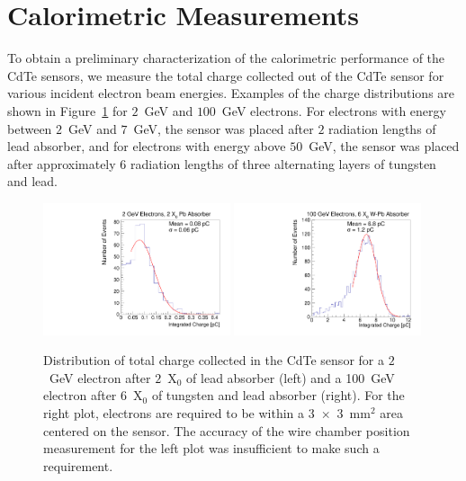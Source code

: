 
\section{Calorimetric Measurements} 
\label{sec:calorimetery} 

To obtain a preliminary characterization of the calorimetric performance 
of the CdTe sensors, we measure the total charge collected out of the CdTe 
sensor for various incident electron beam energies. Examples of the 
charge distributions are shown in Figure~\ref{fig:ChargeDistribution}
for $2$~GeV and $100$~GeV electrons. For electrons with energy between 
$2$~GeV and $7$~GeV, the sensor was placed after $2$ radiation lengths 
of lead absorber, and for electrons with energy above $50$~GeV, the 
sensor was placed after approximately $6$ radiation lengths of three alternating layers of 
tungsten and lead. 

\begin{figure}[htbp] 
\centering
\includegraphics[width=0.49\textwidth]{figures/2GeV_charge.pdf} 
\includegraphics[width=0.49\textwidth]{figures/100GeV_charge.pdf} 
\caption{Distribution of total charge collected in the CdTe sensor for a $2$~GeV
electron after $2$~$\mathrm{X}_{0}$ of lead absorber (left) and a 100~GeV
electron after $6$~$\mathrm{X}_{0}$ of tungsten and lead absorber (right). 
For the right plot, electrons are required to be within a 3~$\times$~3~$\mathrm{mm}^{2}$
area centered on the sensor. The accuracy of the wire chamber position 
measurement for the left plot was insufficient to make such a requirement.} 
\label{fig:ChargeDistribution} 
\end{figure} 

